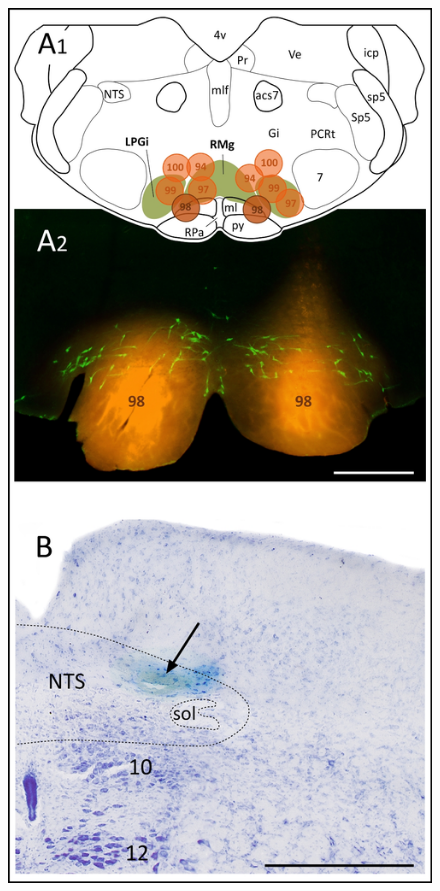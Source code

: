 \documentclass[a4paper,12pt,twoside]{report}
\begin{document}
\begin{figure}[p]

\begin{center}
 \includegraphics[scale=1.1]{Article2-FIG5.jpg} 
\end{center}


\end{figure}
\end{document}
